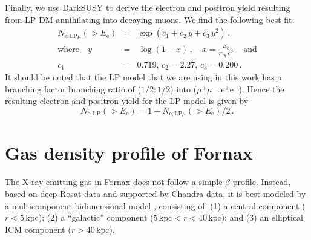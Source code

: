 \documentclass[10pt,aps,pra,reprint,amsmath,amsfonts,amssymb,showpacs,nofootinbib,floatfix]{revtex4-1}
\newcommand{\rmn}{\mathrm}
\newcommand{\ee}{E_\rmn{e}}
\newcommand{\kpc}{\rmn{kpc}}
\newcommand{\e}{\rmn{e}}
\begin{document}
Finally, we use {\sc DarkSUSY} to derive the electron and positron
yield resulting from LP DM annihilating into decaying muons. We find
the following best fit:
\begin{eqnarray}
N_{\e,\rmn{LP}\mu}(>\ee) &=& \exp\left(c_1+c_2\,y+c_3\,y^2\right)
\,,\nonumber\\
\rmn{where}\quad y&=&\,\log\left(1-x\right)\,,\quad 
x=\frac{\ee}{m_\chi\,c^2}\,\quad\rmn{and}\nonumber\\
c_1&=&0.719,\,c_2=2.27,\,c_3=0.200\,.
\label{eq:lp_elec}
\end{eqnarray}
It should be noted that the LP model that we are using in this work
has a branching factor branching ratio of ($1/2:1/2$) into
($\mu^+\mu^-:\e^+\e^-$). Hence the resulting electron and positron
yield for the LP model is given by
\begin{equation}
N_{\e,\rmn{LP}}(>\ee) =
1+N_{\e,\rmn{LP}\mu}(>\ee)/2\,.
\end{equation}

\section{Gas density profile of Fornax}
The X-ray emitting gas in Fornax does not follow a simple
$\beta$-profile. Instead, based on deep Rosat data and supported by
Chandra data, it is best modeled by a multicomponent bidimensional
model \cite{2002ApJ...565..883P}, consisting of: (1) a central
component ($r<5\,\kpc$); (2) a ``galactic'' component
($5\,\kpc<r<40\,\kpc$); and (3) an elliptical ICM component
($r>40\,\kpc$). 
\end{document}
